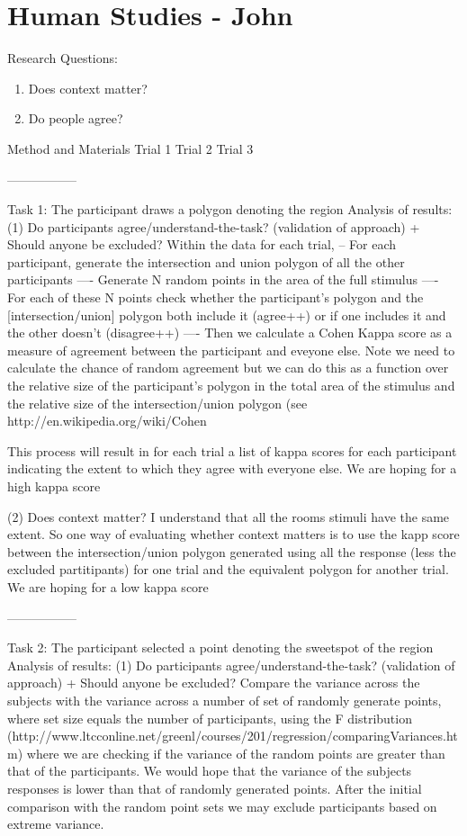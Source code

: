 \documentclass[11pt,letterpaper]{article}
\begin{document}
\section{Human Studies - John}
Research Questions: 
\begin{enumerate}
	\item Does context matter?
	\item Do people agree? 
\end{enumerate}

Method and Materials 
Trial 1
Trial 2
Trial 3

-----------------

Task 1: The participant draws a polygon denoting the region
Analysis of results:
(1) Do participants agree/understand-the-task? (validation of approach) + Should anyone be excluded?
Within the data for each trial,
-- For each participant, generate the intersection and union polygon of all the other participants
---- Generate N random points in the area of the full stimulus
---- For each of these N points check whether the participant's polygon and the [intersection/union] polygon both include it (agree++) or if one includes it and the other doesn't (disagree++)
---- Then we calculate a Cohen Kappa score as a measure of agreement between the participant and eveyone else. Note we need to calculate the chance of random agreement but we can do this as a function over the relative size of the participant's polygon in the total area of the stimulus and the relative size of the intersection/union polygon
(see http://en.wikipedia.org/wiki/Cohen%

This process will result in for each trial a list of kappa scores for each participant indicating the extent to which they agree with everyone else. We are hoping for a high kappa score

(2) Does context matter?
I understand that all the rooms stimuli have the same extent.
So one way of evaluating whether context matters is to use the kapp score between the intersection/union polygon generated using all the response (less the excluded partitipants) for one trial and the equivalent polygon for another trial.
We are hoping for a low kappa score

-----------------

Task 2: The participant selected a point denoting the sweetspot of the region
Analysis of results:
(1) Do participants agree/understand-the-task? (validation of approach) + Should anyone be excluded?
Compare the variance across the subjects with the variance across a number of set of randomly generate points, where set size equals the number of participants, using the F distribution (http://www.ltcconline.net/greenl/courses/201/regression/comparingVariances.htm) where we are checking if the variance of the random points are greater than that of the participants.
We would hope that the variance of the subjects responses is lower than that of randomly generated points.
After the initial comparison with the random point sets we may exclude participants based on extreme variance.
 
\end{document}

